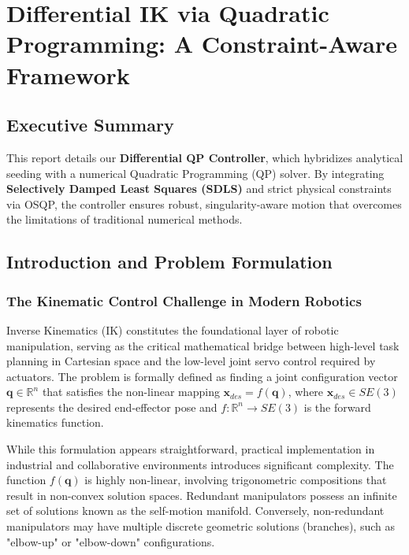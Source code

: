 \documentclass[12pt,a4paper]{report}
\begin{document}
\section{Differential IK via Quadratic Programming: A Constraint-Aware Framework}

\subsection*{Executive Summary}
This report details our \textbf{Differential QP Controller}, which hybridizes analytical seeding with a numerical Quadratic Programming (QP) solver. By integrating \textbf{Selectively Damped Least Squares (SDLS)} and strict physical constraints via OSQP, the controller ensures robust, singularity-aware motion that overcomes the limitations of traditional numerical methods.

\subsection{Introduction and Problem Formulation}

\subsubsection{The Kinematic Control Challenge in Modern Robotics}
Inverse Kinematics (IK) constitutes the foundational layer of robotic manipulation, serving as the critical mathematical bridge between high-level task planning in Cartesian space and the low-level joint servo control required by actuators. The problem is formally defined as finding a joint configuration vector $\mathbf{q} \in \mathbb{R}^n$ that satisfies the non-linear mapping $\mathbf{x}_{des} = f(\mathbf{q})$, where $\mathbf{x}_{des} \in SE(3)$ represents the desired end-effector pose and $f: \mathbb{R}^n \rightarrow SE(3)$ is the forward kinematics function.

While this formulation appears straightforward, practical implementation in industrial and collaborative environments introduces significant complexity. The function $f(\mathbf{q})$ is highly non-linear, involving trigonometric compositions that result in non-convex solution spaces. Redundant manipulators possess an infinite set of solutions known as the self-motion manifold. Conversely, non-redundant manipulators may have multiple discrete geometric solutions (branches), such as "elbow-up" or "elbow-down" configurations.
\end{document}
